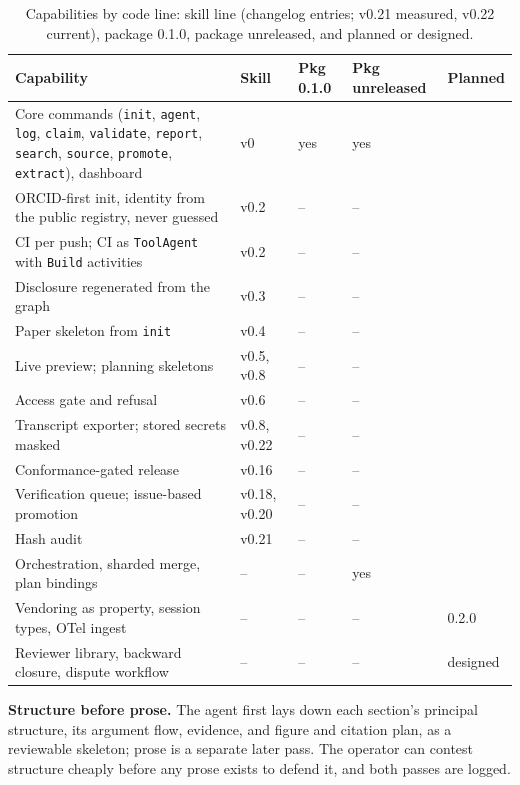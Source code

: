 \begin{table}[t]
\caption{Capabilities by code line: skill line (changelog entries; v0.21
measured, v0.22 current), package 0.1.0, package unreleased, and
planned or designed.}
\label{tab:matrix}
\centering
\footnotesize
\begin{tabular}{p{6.2cm}llll}
\toprule
Capability & Skill & Pkg 0.1.0 & Pkg unreleased & Planned \\
\midrule
Core commands (\texttt{init}, \texttt{agent}, \texttt{log}, \texttt{claim}, \texttt{validate}, \texttt{report}, \texttt{search}, \texttt{source}, \texttt{promote}, \texttt{extract}), dashboard & v0 & yes & yes & \\
ORCID-first init, identity from the public registry, never guessed & v0.2 & -- & -- & \\
CI per push; CI as \texttt{ToolAgent} with \texttt{Build} activities & v0.2 & -- & -- & \\
Disclosure regenerated from the graph & v0.3 & -- & -- & \\
Paper skeleton from \texttt{init} & v0.4 & -- & -- & \\
Live preview; planning skeletons & v0.5, v0.8 & -- & -- & \\
Access gate and refusal & v0.6 & -- & -- & \\
Transcript exporter; stored secrets masked & v0.8, v0.22 & -- & -- & \\
Conformance-gated release & v0.16 & -- & -- & \\
Verification queue; issue-based promotion & v0.18, v0.20 & -- & -- & \\
Hash audit & v0.21 & -- & -- & \\
Orchestration, sharded merge, plan bindings & -- & -- & yes & \\
Vendoring as property, session types, OTel ingest & -- & -- & -- & 0.2.0 \\
Reviewer library, backward closure, dispute workflow & -- & -- & -- & designed \\
\bottomrule
\end{tabular}
\end{table}

\textbf{Structure before prose.} The agent first lays down each
section's principal structure, its argument flow, evidence, and figure
and citation plan, as a reviewable skeleton; prose is a separate later
pass. The operator can contest structure cheaply before any prose
exists to defend it, and both passes are logged.

